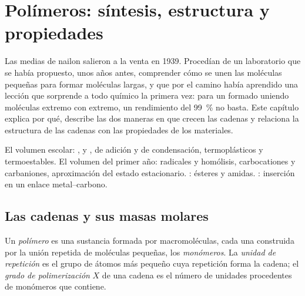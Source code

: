 \chapter{Polímeros: síntesis, estructura y propiedades}\label{ch:b2:polymer-synthesis}

Las medias de nailon salieron a la venta en 1939. Procedían de un laboratorio que se había propuesto, unos años
antes, comprender cómo se unen las moléculas pequeñas para formar moléculas largas, y que por el camino había aprendido una
lección que sorprende a todo químico la primera vez: para un  formado uniendo moléculas extremo con extremo,
un rendimiento del 99~\% no basta. Este capítulo explica por qué, describe las dos maneras en que crecen las cadenas
y relaciona la estructura de las cadenas con las propiedades de los materiales.

\begin{recall}
El volumen escolar: ,  y ,  de adición y de condensación,
termoplásticos y termoestables. El volumen del primer año: radicales y homólisis, carbocationes y
carbaniones, aproximación del estado estacionario. : ésteres y amidas.
: inserción en un enlace metal--carbono.
\end{recall}

\section{Las cadenas y sus masas molares}

\begin{definition}[Polímero]\label{def:b2:polymer-synthesis:polymer}
Un \emph{polímero} es una sustancia formada por macromoléculas, cada una construida por la unión
repetida de moléculas pequeñas, los \emph{monómeros}. La \emph{unidad de repetición}
es el grupo de átomos más pequeño cuya repetición forma la cadena; el \emph{grado de
polimerización} $X$ de una cadena es el número de unidades procedentes de monómeros
que contiene.
\end{definition}

